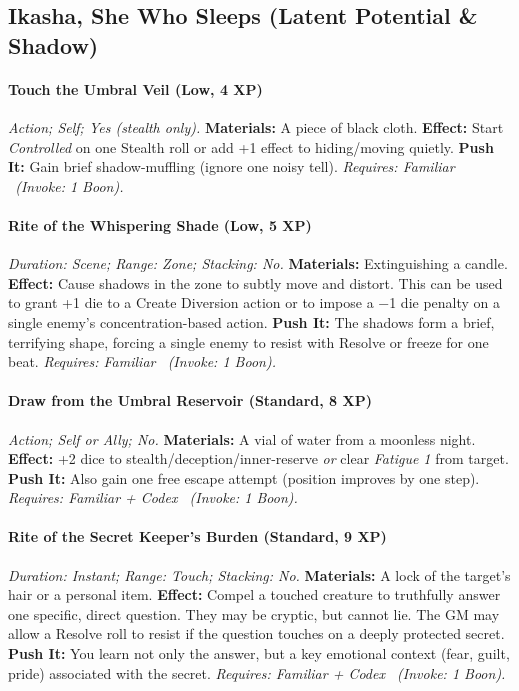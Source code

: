 \documentclass[12pt,twoside]{book}
\begin{document}
\subsection{Ikasha, She Who Sleeps (Latent Potential \& Shadow)}
\paragraph{Touch the Umbral Veil (Low, 4 XP)} \emph{Action; Self; Yes (stealth only).}
\textbf{Materials:} A piece of black cloth.
\textbf{Effect:} Start \emph{Controlled} on one Stealth roll or add +1 effect to hiding/moving quietly.
\textbf{Push It:} Gain brief shadow-muffling (ignore one noisy tell).
\emph{Requires: Familiar \ (\textit{Invoke:} 1 Boon).}
\paragraph{Rite of the Whispering Shade (Low, 5 XP)} \emph{Duration: Scene; Range: Zone; Stacking: No.}
\textbf{Materials:} Extinguishing a candle.
\textbf{Effect:} Cause shadows in the zone to subtly move and distort. This can be used to grant +1 die to a Create Diversion action or to impose a −1 die penalty on a single enemy's concentration-based action.
\textbf{Push It:} The shadows form a brief, terrifying shape, forcing a single enemy to resist with Resolve or freeze for one beat.
\emph{Requires: Familiar \ (\textit{Invoke:} 1 Boon).}
\paragraph{Draw from the Umbral Reservoir (Standard, 8 XP)} \emph{Action; Self or Ally; No.}
\textbf{Materials:} A vial of water from a moonless night.
\textbf{Effect:} +2 dice to stealth/deception/inner-reserve \emph{or} clear \emph{Fatigue 1} from target.
\textbf{Push It:} Also gain one free escape attempt (position improves by one step).
\emph{Requires: Familiar + Codex \ (\textit{Invoke:} 1 Boon).}
\paragraph{Rite of the Secret Keeper's Burden (Standard, 9 XP)} \emph{Duration: Instant; Range: Touch; Stacking: No.}
\textbf{Materials:} A lock of the target's hair or a personal item.
\textbf{Effect:} Compel a touched creature to truthfully answer one specific, direct question. They may be cryptic, but cannot lie. The GM may allow a Resolve roll to resist if the question touches on a deeply protected secret.
\textbf{Push It:} You learn not only the answer, but a key emotional context (fear, guilt, pride) associated with the secret.
\emph{Requires: Familiar + Codex \ (\textit{Invoke:} 1 Boon).}
\end{document}
